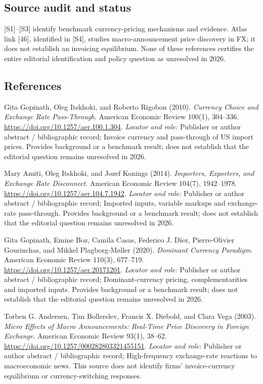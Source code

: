 \documentclass[11pt,a4paper]{article}
\begin{document}
\subsection*{Source audit and status}
[S1]–[S3] identify benchmark currency-pricing mechanisms and evidence. Atlas link [46], identified in [S4], studies macro-announcement price discovery in FX; it does not establish an invoicing equilibrium. None of these references certifies the entire editorial identification and policy question as unresolved in 2026.

\subsection*{References}

\begin{enumerate}[label={[S\arabic*]},leftmargin=*]

\item Gita Gopinath, Oleg Itskhoki, and Roberto Rigobon (2010). \emph{Currency Choice and Exchange Rate Pass-Through}. American Economic Review 100(1), 304–336. \url{https://doi.org/10.1257/aer.100.1.304}.
\textit{Locator and role:} Publisher or author abstract / bibliographic record; Invoice currency and pass-through of US import prices. Provides background or a benchmark result; does not establish that the editorial question remains unresolved in 2026.

\item Mary Amiti, Oleg Itskhoki, and Jozef Konings (2014). \emph{Importers, Exporters, and Exchange Rate Disconnect}. American Economic Review 104(7), 1942–1978. \url{https://doi.org/10.1257/aer.104.7.1942}.
\textit{Locator and role:} Publisher or author abstract / bibliographic record; Imported inputs, variable markups and exchange-rate pass-through. Provides background or a benchmark result; does not establish that the editorial question remains unresolved in 2026.

\item Gita Gopinath, Emine Boz, Camila Casas, Federico J. Díez, Pierre-Olivier Gourinchas, and Mikkel Plagborg-Møller (2020). \emph{Dominant Currency Paradigm}. American Economic Review 110(3), 677–719. \url{https://doi.org/10.1257/aer.20171201}.
\textit{Locator and role:} Publisher or author abstract / bibliographic record; Dominant-currency pricing, complementarities and imported inputs. Provides background or a benchmark result; does not establish that the editorial question remains unresolved in 2026.

\item Torben G. Andersen, Tim Bollerslev, Francis X. Diebold, and Clara Vega (2003). \emph{Micro Effects of Macro Announcements: Real-Time Price Discovery in Foreign Exchange}. American Economic Review 93(1), 38–62. \url{https://doi.org/10.1257/000282803321455151}.
\textit{Locator and role:} Publisher or author abstract / bibliographic record; High-frequency exchange-rate reactions to macroeconomic news. This source does not identify firms’ invoice-currency equilibrium or currency-switching responses.

\end{enumerate}
\end{document}
